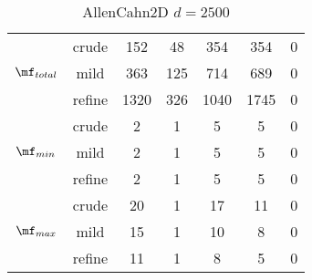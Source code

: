 \begin{table}[htb]
\begin{tabular}{ |c|c|c|c|c|c|c| }
\hline
  & crude & 152 & 48 & 354 & 354 & 0 \\
 $\mf_{total}$  & mild & 363 & 125 & 714 & 689 & 0 \\
  & refine & 1320 & 326 & 1040 & 1745 & 0 \\
\hline
  & crude & 2 & 1 & 5 & 5 & 0 \\
 $\mf_{min}$  & mild & 2 & 1 & 5 & 5 & 0 \\
  & refine & 2 & 1 & 5 & 5 & 0 \\
\hline
  & crude & 20 & 1 & 17 & 11 & 0 \\
 $\mf_{max}$  & mild & 15 & 1 & 10 & 8 & 0 \\
  & refine & 11 & 1 & 8 & 5 & 0 \\
\hline
\end{tabular}
\caption{ AllenCahn2D $d=2500$ }
\end{table}
